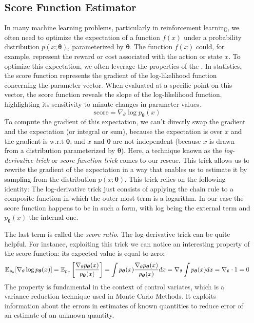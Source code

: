 \subsection{Score Function Estimator}
In many machine learning problems, particularly in reinforcement learning, we often need to optimize the expectation of a function $f(x)$ under a probability distribution $p(x; \boldsymbol{\theta})$, parameterized by $\boldsymbol{\theta}$. The function $f(x)$ could, for example, represent the reward or cost associated with the action or state $x$. To optimize this expectation, we often leverage the properties of the . In statistics, the score function represents the gradient of the log-likelihood function concerning the parameter vector. When evaluated at a specific point on this vector, the score function reveals the slope of the log-likelihood function, highlighting its sensitivity to minute changes in parameter values.
$$
\text{score} = \nabla_{\theta} \log p_{\boldsymbol{\theta}}(x)
$$
To compute the gradient of this expectation, we can't directly swap the gradient and the expectation (or integral or sum), because the expectation is over $x$ and the gradient is w.r.t $\boldsymbol{\theta}$, and $x$ and $\boldsymbol{\theta}$ are not independent (because $x$ is drawn from a distribution parameterized by $\boldsymbol{\theta}$). Here, a technique known as the \textit{log-derivative trick} or \textit{score function trick} comes to our rescue.
This trick allows us to rewrite the gradient of the expectation in a way that enables us to estimate it by sampling from the distribution $p(x; \boldsymbol{\theta})$. This trick relies on the following identity:
The log-derivative trick just consists of applying the chain rule to a composite function in which the outer most term is a logarithm. In our case the score function happens to be in such a form, with log being the external term and $p_{\boldsymbol{\theta}}(x)$ the internal one. 


The last term is called the \textit{score ratio}. The log-derivative trick can be quite helpful. For instance, exploiting this trick we can notice an interesting property of the score function: its expected value is equal to zero:
$$
\mathbb E_{p_{\theta}}[\nabla_{\theta} \log   p_{\boldsymbol{\theta}}(x)]
= \mathbb E_{p_{\theta}} \left[ \frac{\nabla_{\theta}p_{\boldsymbol{\theta}}(x)}{p_{\boldsymbol{\theta}}(x) } \right] 
= \int p_{\boldsymbol{\theta}}(x) \frac{\nabla_{\theta}p_{\boldsymbol{\theta}}(x)}{p_{\boldsymbol{\theta}}(x) } dx
 = \nabla_{\theta} \int p_{\boldsymbol{\theta}}(x) dx = \nabla_{\theta} \cdot 1 = 0
$$
The property is fundamental in the context of control variates, which is a variance reduction technique used in Monte Carlo Methods. It exploits information about the errors in estimates of known quantities  to reduce error of an estimate of an unknown quantity. 


